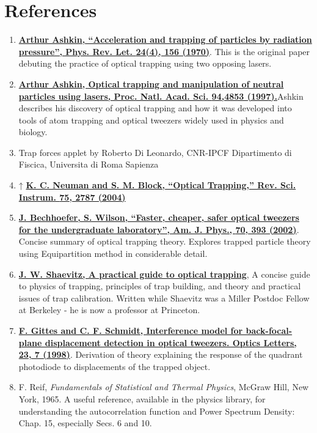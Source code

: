\documentclass{../lab}
\begin{document}
\section{References}

\begin{enumerate}
    \item \href{http://prl.aps.org/abstract/PRL/v24/i4/p156\_1}{\textbf{\textbf{Arthur Ashkin, ``Acceleration and trapping of particles by radiation pressure'', }Phys. Rev. Let. \textbf{24}(4), 156 (1970)}}. This is the original paper debuting the practice of optical trapping using two opposing lasers.

    \item \href{http://www.pnas.org/content/94/10/4853.full}{\textbf{\textbf{Arthur Ashkin, Optical trapping and manipulation of neutral particles using lasers}, Proc. Natl. Acad. Sci. \textbf{94},4853 (1997).}}Ashkin describes his discovery of optical trapping and how it was developed into tools of atom trapping and optical tweezers widely used in physics and biology.

    \item Trap forces applet by Roberto Di Leonardo, CNR-IPCF Dipartimento di Fiscica, Universita di Roma Sapienza

    \item ↑ \textbf{ }\href{http://rsi.aip.org/resource/1/rsinak/v75/i9/p2787\_s1}{\textbf{K. C. Neuman and S. M. Block, ``Optical Trapping,'' Rev. Sci. Instrum. \textbf{75}, 2787 (2004)}}

    \item \href{http://ajp.aapt.org/resource/1/ajpias/v70/i4/p393\_s1}{\textbf{J. Bechhoefer, S. Wilson, ``Faster, cheaper, safer optical tweezers for the undergraduate laboratory'', Am. J. Phys., \textbf{70}, 393 (2002)}}. Concise summary of optical trapping theory. Explores trapped particle theory using Equipartition method in considerable detail.

    \item \href{http://sites.google.com/site/shaevitzlab/links}{\textbf{J. W. Shaevitz, A practical guide to optical trapping}}, A concise guide to physics of trapping, principles of trap building, and theory and practical issues of trap calibration. Written while Shaevitz was a Miller Postdoc Fellow at Berkeley - he is now a professor at Princeton.

    \item \href{http://www.opticsinfobase.org/ol/abstract.cfm?uri=ol-23-1-7}{\textbf{F. Gittes and C. F. Schmidt, Interference model for back-focal-plane displacement detection in optical tweezers. Optics Letters, \textbf{23}, 7 (1998)}}. Derivation of theory explaining the response of the quadrant photodiode to displacements of the trapped object.

    \item F. Reif, \emph{Fundamentals of Statistical and Thermal Physics}, McGraw Hill, New York, 1965. A useful reference, available in the physics library, for understanding the autocorrelation function and Power Spectrum Density: Chap. 15, especially Secs. 6 and 10.

\end{enumerate}
\end{document}
